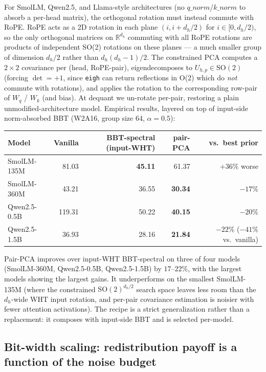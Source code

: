 \documentclass[11pt]{article}
\newcommand{\R}{\mathbb{R}}
\begin{document}
For SmolLM, Qwen2.5, and Llama-style architectures (no $q\_norm$/$k\_norm$ to absorb a per-head matrix), the orthogonal rotation must instead commute with RoPE. RoPE acts as a 2D rotation in each plane $(i, i+d_h/2)$ for $i \in [0, d_h/2)$, so the only orthogonal matrices on $\R^{d_h}$ commuting with all RoPE rotations are products of independent SO(2) rotations on these planes --- a much smaller group of dimension $d_h/2$ rather than $d_h(d_h-1)/2$. The constrained PCA computes a $2\times 2$ covariance per (head, RoPE-pair), eigendecomposes to $U_{h,p} \in \mathrm{SO}(2)$ (forcing $\det = +1$, since \texttt{eigh} can return reflections in O(2) which do \emph{not} commute with rotations), and applies the rotation to the corresponding row-pair of $W_q$ / $W_k$ (and bias). At dequant we un-rotate per-pair, restoring a plain unmodified-architecture model. Empirical results, layered on top of input-side norm-absorbed BBT (W2A16, group size 64, $\alpha=0.5$):
\begin{center}
\begin{tabular}{lrrrr}
\toprule
Model & Vanilla & BBT-spectral (input-WHT) & \textbf{pair-PCA} & vs.\ best prior \\
\midrule
SmolLM-135M & 81.03 & \textbf{45.11} & 61.37 & $+36\%$ worse \\
SmolLM-360M & 43.21 & 36.55 & \textbf{30.34} & $-17\%$ \\
Qwen2.5-0.5B & 119.31 & 50.22 & \textbf{40.15} & $-20\%$ \\
Qwen2.5-1.5B & 36.93 & 28.16 & \textbf{21.84} & $-22\%$ ($-41\%$ vs.\ vanilla) \\
\bottomrule
\end{tabular}
\end{center}
Pair-PCA improves over input-WHT BBT-spectral on three of four models (SmolLM-360M, Qwen2.5-0.5B, Qwen2.5-1.5B) by $17$--$22\%$, with the largest models showing the largest gains. It underperforms on the smallest SmolLM-135M (where the constrained $\mathrm{SO}(2)^{d_h/2}$ search space leaves less room than the $d_h$-wide WHT input rotation, and per-pair covariance estimation is noisier with fewer attention activations). The recipe is a strict generalization rather than a replacement: it composes with input-side BBT and is selected per-model.

\subsection{Bit-width scaling: redistribution payoff is a function of the noise budget}
\end{document}
